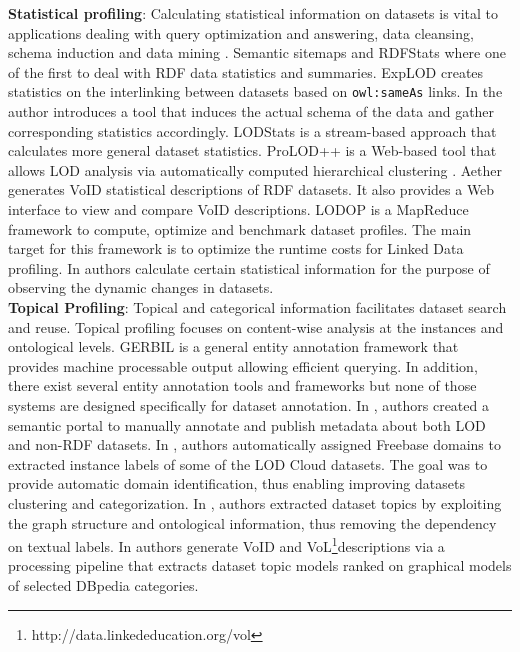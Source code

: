 \documentclass[runningheads,a4paper]{llncs}
\begin{document}
\textbf{Statistical profiling}: Calculating statistical information on datasets is vital to applications dealing with query optimization and answering, data cleansing, schema induction and data mining \cite{profilingWebOfData} \cite{datafinland2} \cite{6690016}. Semantic sitemaps \cite{Cyganiak:2008:SSE:1789394.1789457} and RDFStats \cite{Langegger:2009:RER:1674635.1674691} where one of the first to deal with RDF data statistics and summaries. ExpLOD \cite{Khatchadourian:2010:ESE:2155278.2155300} creates statistics on the interlinking between datasets based on \texttt{owl:sameAs} links. In \cite{semwebprofiling} the author introduces a tool that induces the actual schema of the data and gather corresponding statistics accordingly. LODStats  \cite{Auer:2012:LEF:2413941.2413982} is a stream-based approach that calculates more general dataset statistics. ProLOD++ \cite{6816740} is a Web-based tool that allows LOD analysis via automatically computed hierarchical clustering \cite{5452762}. Aether \cite{makela-aether-2014} generates VoID statistical descriptions of RDF datasets. It also provides a Web interface to view and compare VoID descriptions. LODOP \cite{forchhammer_profiles_2014} is a MapReduce framework to compute, optimize and benchmark dataset profiles. The main target for this framework is to optimize the runtime costs for Linked Data profiling. In \cite{DyLDO} authors calculate certain statistical information for the purpose of observing the dynamic changes in datasets.\\

\textbf{Topical Profiling}: Topical and categorical information facilitates dataset search and reuse. Topical profiling focuses on content-wise analysis at the instances and ontological levels. GERBIL \cite{gerbil} is a general entity annotation framework that provides machine processable output allowing efficient querying. In addition, there exist several entity annotation tools and frameworks \cite{Cornolti:2013:FBE:2488388.2488411} but none of those systems are designed specifically for dataset annotation. In \cite{datafinalnd}, authors created a semantic portal to manually annotate and publish metadata about both LOD and non-RDF datasets. In \cite{6690016}, authors automatically assigned Freebase domains to extracted instance labels of some of the LOD Cloud datasets. The goal was to provide automatic domain identification, thus enabling improving datasets clustering and categorization. In \cite{Bohm:2012:LTG:2396761.2398718}, authors extracted dataset topics by exploiting the graph structure and ontological information, thus removing the dependency on textual labels. In  \cite{scalableApproach} authors generate VoID and VoL\footnote{http://data.linkededucation.org/vol }descriptions via a processing pipeline that extracts dataset topic models ranked on graphical models of selected DBpedia categories.\\
\end{document}
